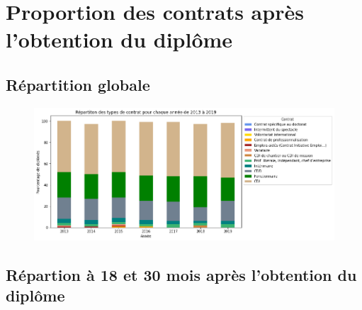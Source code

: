 \documentclass[12pt, a4paper, titlepage, table]{article}
\begin{document}
\section{Proportion des contrats après l'obtention du diplôme}
	\subsection{Répartition globale}

		\begin{figure}[H]
			\centering
			\includegraphics[width=1\textwidth]{../graphs/repartition_contrats_global.png}
		\end{figure}

	\subsection{Répartion à 18 et 30 mois après l'obtention du diplôme}
\end{document}
